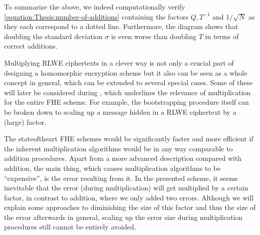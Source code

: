 \documentclass[letterpaper,10pt,english]{jupyterBook}
\begin{document}
\sphinxAtStartPar
To summarize the above, we indeed computationally verify \eqref{equation:Thesis:number-of-additions} containing the factors \(Q, T^{-1}\) and \(1/\sqrt{N}\) as they each correspond to a dotted line.
Furthermore, the diagram shows that doubling the standard deviation \(\sigma\) is even worse than doubling \(T\) in terms of correct additions.

\begin{DUlineblock}{0em}
\item[] 
\end{DUlineblock}

\begin{DUlineblock}{0em}
\item[] 
\end{DUlineblock}

\sphinxAtStartPar
Multiplying RLWE ciphertexts in a clever way is not only a crucial part of designing a homomorphic encryption scheme but it also can be seen as a whole concept in general, which can be extended to several special cases.
Some of these will later be considered during {\hyperref[\detokenize{Thesis:preparations-for-bootstrapping}]{}}, which underlines the relevance of multiplication for the entire FHE scheme.
For example, the bootstrapping procedure itself can be broken down to scaling up a message hidden in a RLWE ciphertext by a (large) factor.

\sphinxAtStartPar
The state\sphinxhyphen{}of\sphinxhyphen{}the\sphinxhyphen{}art FHE schemes would be significantly faster and more efficient if the inherent multiplication algorithms would be in any way comparable to addition procedures.
Apart from a more advanced description compared with addition, the main thing, which causes multiplication algorithms to be “expensive”, is the error resulting from it.
In the presented scheme, it seems inevitable that the error (during multiplication) will get multiplied by a certain factor, in contrast to addition, where we only added two errors.
Although we will explain some approaches to diminishing the size of this factor and thus the size of the error afterwards in general, scaling up the error size during multiplication procedures still cannot be entirely avoided.

\begin{DUlineblock}{0em}
\item[] 
\end{DUlineblock}
\end{document}

